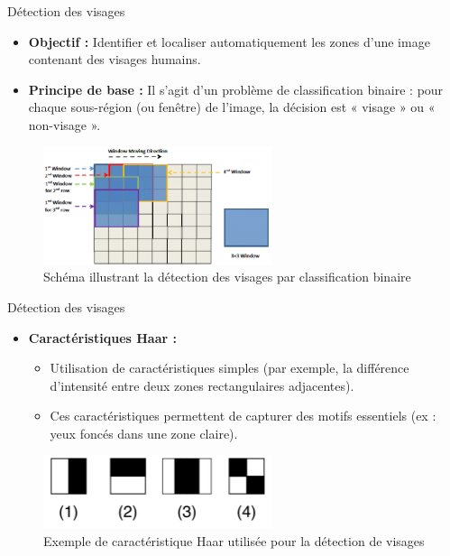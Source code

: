 \documentclass{beamer}
\begin{document}
\begin{frame}{Détection des visages}
    \begin{itemize}
        \item \textbf{Objectif :}  
              Identifier et localiser automatiquement les zones d'une image contenant des visages humains.
        \item \textbf{Principe de base :}  
              Il s'agit d'un problème de classification binaire : pour chaque sous-région (ou fenêtre) de l'image, la décision est « visage » ou « non-visage ».
    \end{itemize}
    \begin{figure}[ht]
        \centering
        \includegraphics[width=0.6\textwidth]{sliding_window.png} %
        \caption{Schéma illustrant la détection des visages par classification binaire}
        \label{fig:face_detection}
    \end{figure}
\end{frame}


\begin{frame}{Détection des visages}
    \begin{itemize}
        \item \textbf{Caractéristiques Haar :}  
              \begin{itemize}
                  \item Utilisation de caractéristiques simples (par exemple, la différence d'intensité entre deux zones rectangulaires adjacentes).
                  \item Ces caractéristiques permettent de capturer des motifs essentiels (ex : yeux foncés dans une zone claire).
              \end{itemize}
    \end{itemize}
    \begin{figure}[ht]
        \centering
        \includegraphics[width=0.6\textwidth]{haar_feature_1.png} %
        \caption{Exemple de caractéristique Haar utilisée pour la détection de visages}
        \label{fig:haar_feature}
    \end{figure}
    
\end{frame}
\end{document}
